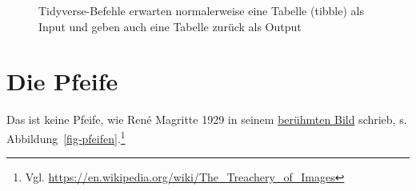 \documentclass[
  a4paper,
  DIV=11]{scrreprt}
\theoremstyle{definition}
\theoremstyle{definition}
\theoremstyle{definition}
\theoremstyle{remark}
\begin{document}
\begin{figure}


\caption{\label{fig-tbl-in-out}Tidyverse-Befehle erwarten normalerweise
eine Tabelle (tibble) als Input und geben auch eine Tabelle zurück als
Output}

\end{figure}%

\section{Die Pfeife}\label{sec-pipe}

Das ist keine Pfeife, wie René Magritte 1929 in seinem
\href{https://en.wikipedia.org/wiki/File:MagrittePipe.jpg}{berühmten
Bild} schrieb, s. Abbildung~\ref{fig-pfeifen}.\footnote{Vgl.
  \url{https://en.wikipedia.org/wiki/The_Treachery_of_Images}}
\end{document}
